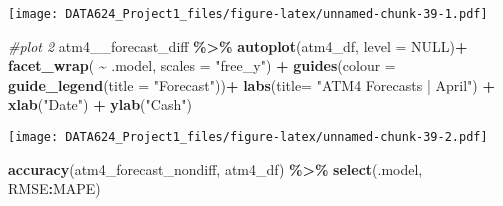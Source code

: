 \documentclass[
]{article}
\newenvironment{Shaded}{\begin{snugshade}}{\end{snugshade}}
\newcommand{\AttributeTok}[1]{\textcolor[rgb]{0.13,0.29,0.53}{#1}}
\newcommand{\CommentTok}[1]{\textcolor[rgb]{0.56,0.35,0.01}{\textit{#1}}}
\newcommand{\ConstantTok}[1]{\textcolor[rgb]{0.56,0.35,0.01}{#1}}
\newcommand{\FunctionTok}[1]{\textcolor[rgb]{0.13,0.29,0.53}{\textbf{#1}}}
\newcommand{\NormalTok}[1]{#1}
\newcommand{\SpecialCharTok}[1]{\textcolor[rgb]{0.81,0.36,0.00}{\textbf{#1}}}
\newcommand{\StringTok}[1]{\textcolor[rgb]{0.31,0.60,0.02}{#1}}
\begin{document}
\begin{Shaded}
\end{Shaded}

\texttt{[image: DATA624\_Project1\_files/figure-latex/unnamed-chunk-39-1.pdf]}

\begin{Shaded}
\begin{Highlighting}[]
\CommentTok{\#plot 2}
\NormalTok{atm4\_\_forecast\_diff }\SpecialCharTok{\%\textgreater{}\%}
  \FunctionTok{autoplot}\NormalTok{(atm4\_df, }\AttributeTok{level =} \ConstantTok{NULL}\NormalTok{)}\SpecialCharTok{+}
  \FunctionTok{facet\_wrap}\NormalTok{( }\SpecialCharTok{\textasciitilde{}}\NormalTok{ .model, }\AttributeTok{scales =} \StringTok{"free\_y"}\NormalTok{) }\SpecialCharTok{+}
  \FunctionTok{guides}\NormalTok{(}\AttributeTok{colour =} \FunctionTok{guide\_legend}\NormalTok{(}\AttributeTok{title =} \StringTok{"Forecast"}\NormalTok{))}\SpecialCharTok{+}
  \FunctionTok{labs}\NormalTok{(}\AttributeTok{title=} \StringTok{"ATM4 Forecasts | April"}\NormalTok{) }\SpecialCharTok{+}
  \FunctionTok{xlab}\NormalTok{(}\StringTok{"Date"}\NormalTok{) }\SpecialCharTok{+}
  \FunctionTok{ylab}\NormalTok{(}\StringTok{"Cash"}\NormalTok{)}
\end{Highlighting}
\end{Shaded}

\texttt{[image: DATA624\_Project1\_files/figure-latex/unnamed-chunk-39-2.pdf]}

\begin{Shaded}
\begin{Highlighting}[]
\FunctionTok{accuracy}\NormalTok{(atm4\_forecast\_nondiff, atm4\_df) }\SpecialCharTok{\%\textgreater{}\%}
  \FunctionTok{select}\NormalTok{(.model, RMSE}\SpecialCharTok{:}\NormalTok{MAPE)}
\end{Highlighting}
\end{Shaded}
\end{document}
